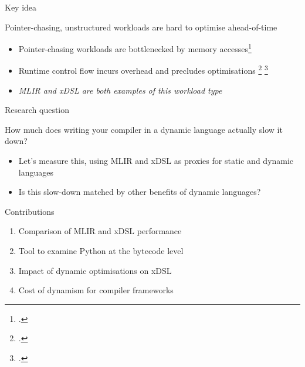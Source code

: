 \documentclass[10pt,aspectratio=169]{beamer}
\renewcommand{\cite}{\footcite}
\begin{document}
\begin{frame}{Key idea}
    \begin{center}
        \huge Pointer-chasing, unstructured workloads are hard to optimise ahead-of-time
    \end{center}
    \vspace{1em}
    \begin{itemize}
        \item Pointer-chasing workloads are bottlenecked by memory accesses\cite{wangEvaluatingSynchronizationOverhead2025}
        \item Runtime control flow incurs overhead and precludes optimisations \cite{driesenDirectCostVirtual1996}  \cite{emerybergerPythonPerformanceMatters2022}
        \item \textit{MLIR and xDSL are both examples of this workload type}
    \end{itemize}
\end{frame}

\begin{frame}{Research question}
    \begin{center}
        \huge How much does writing your compiler in a dynamic language actually slow it down? \\
    \end{center}
    \vspace{1.5em}
    \begin{itemize}
        \item Let's measure this, using MLIR and xDSL as proxies for static and dynamic languages
        \item Is this slow-down matched by other benefits of dynamic languages?
    \end{itemize}
\end{frame}

\begin{frame}{Contributions}
    \Large
    \begin{enumerate}
        \item Comparison of MLIR and xDSL performance
        \vspace{0.5em}
        \item Tool to examine Python at the bytecode level
        \vspace{0.5em}
        \item Impact of dynamic optimisations on xDSL
        \vspace{0.5em}
        \item Cost of dynamism for compiler frameworks
    \end{enumerate}
\end{frame}
\end{document}
